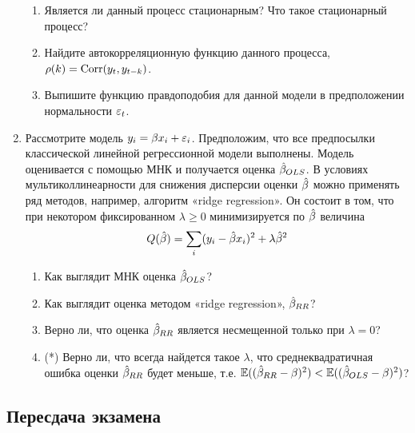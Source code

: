 \documentclass[12pt, a4paper]{article}\usepackage[]{graphicx}\usepackage[]{color}
\begin{document}
\begin{enumerate}
\begin{enumerate}
\item Является ли данный процесс стационарным? Что такое стационарный процесс?
\item Найдите автокорреляционную функцию данного процесса, $\rho(k)=\operatorname{Corr}(y_t,y_{t-k})$.
\item Выпишите функцию правдоподобия для данной модели в предположении нормальности $\varepsilon_t$.
\end{enumerate}



\item Рассмотрите модель $y_i=\beta x_i+\varepsilon_i$. Предположим, что все предпосылки классической линейной регрессионной модели выполнены. Модель оценивается с помощью МНК и получается оценка $\hat{\beta}_{OLS}$.
В условиях мультиколлинеарности для снижения дисперсии оценки $\hat{\beta}$ можно применять ряд методов, например, алгоритм «ridge regression». Он состоит в том, что при некотором фиксированном $\lambda\geq 0$ минимизируется по $\hat{\beta}$ величина
\[
Q(\hat{\beta})=\sum_i (y_i-\hat{\beta} x_i)^2+\lambda \hat{\beta}^2
\]
\begin{enumerate}
\item Как выглядит МНК оценка $\hat{\beta}_{OLS}$?
\item Как выглядит оценка методом «ridge regression», $\hat{\beta}_{RR}$?
\item Верно ли, что оценка $\hat{\beta}_{RR}$ является несмещенной только при $\lambda=0$?
\item (*) Верно ли, что всегда найдется такое $\lambda$, что среднеквадратичная ошибка оценки $\hat{\beta}_{RR}$ будет меньше, т.е. $\mathbb{E}((\hat{\beta}_{RR}-\beta)^2)<\mathbb{E}((\hat{\beta}_{OLS}-\beta)^2)$?
\end{enumerate}


\end{enumerate}


\subsection{Пересдача экзамена}
\end{document}
